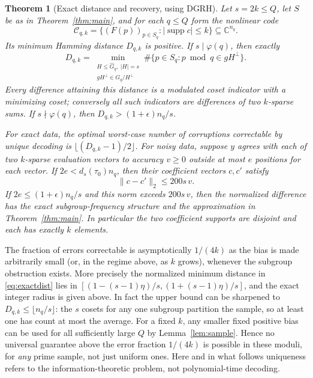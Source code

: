 \documentclass[11pt]{article}
\newtheorem{theorem}{Theorem}[section]
\theoremstyle{definition}\newtheorem{remark}[theorem]{Remark}
\newcommand{\C}{\mathbb C}
\newcommand{\supp}{\operatorname{supp}}
\newcommand{\abs}[1]{\lvert #1\rvert}
\newcommand{\norm}[1]{\lVert #1\rVert}
\newcommand{\GRH}{\textup{DGRH}}
\begin{document}
\begin{theorem}[Exact distance and recovery, using \GRH]\label{thm:code}
Let $s=2k\le Q$, let $S$ be as in Theorem~\ref{thm:main}, and for each $q\le Q$ form the nonlinear code
\[
 \mathcal C_{q,k}=\{(F(p))_{p\in S_q}:\abs{\supp c}\le k\}\subseteq\C^{n_q}.
\]
Its minimum Hamming distance $D_{q,k}$ is positive. If $s\mid\varphi(q)$, then exactly
\begin{equation}\label{eq:exactdist}
 D_{q,k}=\min_{\substack{H\le\widehat G_q,\ |H|=s\\gH^\perp\in G_q/H^\perp}}
     \#\{p\in S_q:p\bmod q\in gH^\perp\}.
\end{equation}
Every difference attaining this distance is a modulated coset indicator with a minimizing coset; conversely all such indicators are differences of two $k$-sparse sums. If $s\nmid\varphi(q)$, then $D_{q,k}>(1+\epsilon)n_q/s$.

For exact data, the optimal worst-case number of corruptions correctable by unique decoding is $\lfloor(D_{q,k}-1)/2\rfloor$. For noisy data, suppose $y$ agrees with each of two $k$-sparse evaluation vectors to accuracy $v\ge0$ outside at most $e$ positions for each vector. If $2e<d_s(\tau_0)n_q$, then their coefficient vectors $c,c'$ satisfy
\begin{equation}\label{eq:noise}
 \norm{c-c'}_2\le 200s\,v.
\end{equation}
If $2e\le(1+\epsilon)n_q/s$ and this norm exceeds $200s\,v$, then the normalized difference has the exact subgroup-frequency structure and the approximation in Theorem~\ref{thm:main}. In particular the two coefficient supports are disjoint and each has exactly $k$ elements.
\end{theorem}
The fraction of errors correctable is asymptotically $1/(4k)$ as the bias is made arbitrarily small (or, in the regime above, as $k$ grows), whenever the subgroup obstruction exists. More precisely the normalized minimum distance in \eqref{eq:exactdist} lies in $[(1-(s-1)\eta)/s,(1+(s-1)\eta)/s]$, and the exact integer radius is given above. In fact the upper bound can be sharpened to $D_{q,k}\le\lfloor n_q/s\rfloor$: the $s$ cosets for any one subgroup partition the sample, so at least one has count at most the average. For a fixed $k$, any smaller fixed positive bias can be used for all sufficiently large $Q$ by Lemma~\ref{lem:sample}. Hence no universal guarantee above the error fraction $1/(4k)$ is possible in these moduli, for \emph{any} prime sample, not just uniform ones. Here and in what follows uniqueness refers to the information-theoretic problem, not polynomial-time decoding.
\end{document}

